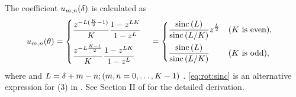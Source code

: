 \documentclass[sip,biber]{now-journal}
\begin{document}
The coefficient $u _{m,n}(\delta)$ is calculated as
\begin{align}
  u _{m,n}(\theta)
  &=
    \begin{cases}
      \displaystyle\frac{z ^{- L (\frac{K}{2} - 1) }}{K} \frac{1 - z ^{L K}}{1 - z ^{L}}\\[1em]
      \displaystyle\frac{z ^{- L \frac{K - 1}{2}}}{K} \frac{1 - z ^{L K}}{1 - z ^{L}}
    \end{cases}
  =
    \begin{cases}
      \displaystyle \frac{\operatorname{sinc}{(L)}}{\operatorname{sinc}{\left(L / K\right)}} z ^{\frac{L}{2}} & (\text{$K$ is even}),\\[1em]
      \displaystyle \frac{\operatorname{sinc}{(L)}}{\operatorname{sinc}{\left(L / K\right)}} & (\text{$K$ is odd}),
    \end{cases}\label{eq:rot:sinc}
\end{align}
where and $L =\delta + m - n; (m, n = 0, \dots, K - 1)$ \cite{Wakabayashi:2023:ASLP}.
\eqref{eq:rot:sinc} is an alternative expression for (3) in \cite{Wakabayashi:2023:ASLP}.
See Section II of \cite{Wakabayashi:2023:ASLP} for the detailed derivation.
\end{document}
